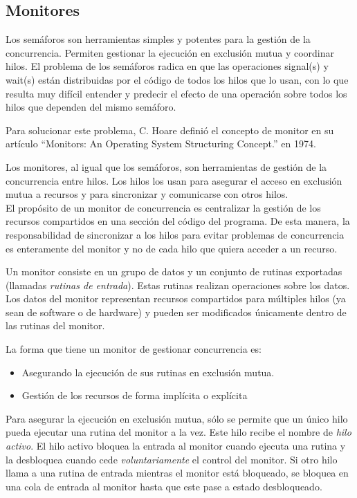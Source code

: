 \subsection{Monitores}
\label{monitores}

Los semáforos son herramientas simples y potentes para la gestión de la
concurrencia. Permiten gestionar la ejecución en exclusión mutua y coordinar
hilos. El problema de los semáforos radica en que las operaciones signal(s)
y wait(s) están distribuidas por el código de todos los hilos que lo usan,
con lo que resulta muy difícil entender y predecir el efecto de una operación
sobre todos los hilos que dependen del mismo semáforo.

Para solucionar este problema, C. Hoare definió el concepto de monitor en su
artículo “Monitors: An Operating System Structuring Concept.” en 1974.

Los monitores, al igual que los semáforos, son herramientas de gestión de la
concurrencia entre hilos. Los hilos los usan para asegurar el acceso en
exclusión mutua a recursos y para sincronizar y comunicarse con otros
hilos.\\
El propósito de un monitor de concurrencia es centralizar la gestión de los
recursos compartidos en una sección del código del programa. De esta manera, la
responsabilidad de sincronizar a los hilos para evitar problemas de concurrencia
es enteramente del monitor y no de cada hilo que quiera acceder a un recurso.

Un monitor consiste en un grupo de datos y un conjunto de rutinas exportadas
(llamadas \textit{rutinas de entrada}). Estas rutinas realizan operaciones sobre
los datos. Los datos del monitor representan recursos compartidos para múltiples
hilos (ya sean de software o de hardware) y pueden ser modificados únicamente
dentro de las rutinas del monitor.

La forma que tiene un monitor de gestionar concurrencia es:
\begin{itemize}
    \item Asegurando la ejecución de sus rutinas en exclusión mutua.
    \item Gestión de los recursos de forma implícita o explícita
\end{itemize}

Para asegurar la ejecución en exclusión mutua, sólo se permite que un único
hilo pueda ejecutar una rutina del monitor a la vez. Este hilo recibe el
nombre de \textit{hilo activo}. El hilo activo bloquea la entrada al
monitor cuando ejecuta una rutina y la desbloquea cuando cede
\textit{voluntariamente} el control del monitor. Si otro hilo llama a una
rutina de entrada mientras el monitor está bloqueado, se bloquea en una cola de
entrada al monitor hasta que este pase a estado desbloqueado.

